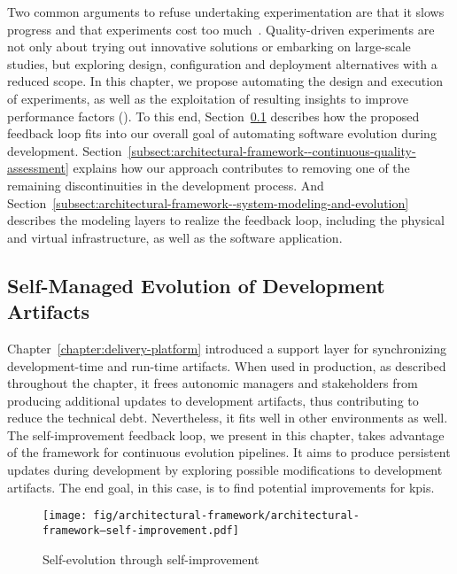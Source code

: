 Two common arguments to refuse undertaking experimentation are that it slows progress and that experiments cost too much~\cite{tichy-1998-should}. Quality-driven experiments are not only about trying out innovative solutions or embarking on large-scale studies, but exploring design, configuration and deployment alternatives with a reduced scope. In this chapter, we propose automating the design and execution of experiments, as well as the exploitation of resulting insights to improve performance factors (). To this end, Section~\ref{subsect:architectural-framework--self-improvement} describes how the proposed feedback loop fits into our overall goal of automating software evolution during development. Section~\ref{subsect:architectural-framework--continuous-quality-assessment} explains how our approach contributes to removing one of the remaining discontinuities in the development process. And Section~\ref{subsect:architectural-framework--system-modeling-and-evolution} describes the modeling layers to realize the feedback loop, including the physical and virtual infrastructure, as well as the software application.

\subsection{Self-Managed Evolution of Development Artifacts}
\label{subsect:architectural-framework--self-improvement}

Chapter~\ref{chapter:delivery-platform} introduced a support layer for synchronizing development-time and run-time artifacts. When used in production, as described throughout the chapter, it frees autonomic managers and stakeholders from producing additional updates to development artifacts, thus contributing to reduce the technical debt. Nevertheless, it fits well in other environments as well. The self-improvement feedback loop, we present in this chapter, takes advantage of the framework for continuous evolution pipelines. It aims to produce persistent updates during development by exploring possible modifications to development artifacts. The end goal, in this case, is to find potential improvements for \glspl{kpi}.

\begin{figure}[h]
	\centering
	\texttt{[image: fig/architectural-framework/architectural-framework--self-improvement.pdf]}
	\caption{Self-evolution through self-improvement}
	\label{fig:architectural-framework--evolution-outline-self-improvement}
\end{figure}

